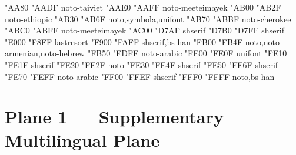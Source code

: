 \documentclass{article}
\begin{document}
                                       {  "AA80} {  "AADF} {noto-taiviet}
                        {  "AAE0} {  "AAFF} {noto-meeteimayek}
                            {  "AB00} {  "AB2F} {noto-ethiopic}
                               {  "AB30} {  "AB6F} {noto,symbola,unifont}
                            {  "AB70} {  "ABBF} {noto-cherokee}
                                   {  "ABC0} {  "ABFF} {noto-meeteimayek}
                               {  "AC00} {  "D7AF} {shserif}
                         {  "D7B0} {  "D7FF} {shserif}
                               {  "E000} {  "F8FF} {lastresort}
                   {  "F900} {  "FAFF} {shserif,bs-han}
                  {  "FB00} {  "FB4F} {noto,noto-armenian,noto-hebrew}
                    {  "FB50} {  "FDFF} {noto-arabic}
                            {  "FE00} {  "FE0F} {unifont}
                                 {  "FE10} {  "FE1F} {shserif}
                           {  "FE20} {  "FE2F} {noto}
                        {  "FE30} {  "FE4F} {shserif}
                            {  "FE50} {  "FE6F} {shserif}
                    {  "FE70} {  "FEFF} {noto-arabic}
                  {  "FF00} {  "FFEF} {shserif}
                                       {  "FFF0} {  "FFFF} {noto,bs-han}

\section{Plane 1 --- Supplementary Multilingual Plane}
\end{document}
